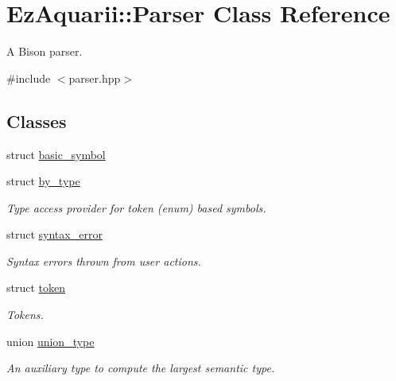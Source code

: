 \hypertarget{classEzAquarii_1_1Parser}{}\section{Ez\+Aquarii\+:\+:Parser Class Reference}
\label{classEzAquarii_1_1Parser}


A Bison parser.  




{\ttfamily \#include $<$parser.\+hpp$>$}

\subsection*{Classes}
\begin{DoxyCompactItemize}
\item 
struct \hyperlink{structEzAquarii_1_1Parser_1_1basic__symbol}{basic\+\_\+symbol}
\item 
struct \hyperlink{structEzAquarii_1_1Parser_1_1by__type}{by\+\_\+type}
\begin{DoxyCompactList}\small\item\em Type access provider for token (enum) based symbols. \end{DoxyCompactList}\item 
struct \hyperlink{structEzAquarii_1_1Parser_1_1syntax__error}{syntax\+\_\+error}
\begin{DoxyCompactList}\small\item\em Syntax errors thrown from user actions. \end{DoxyCompactList}\item 
struct \hyperlink{structEzAquarii_1_1Parser_1_1token}{token}
\begin{DoxyCompactList}\small\item\em Tokens. \end{DoxyCompactList}\item 
union \hyperlink{unionEzAquarii_1_1Parser_1_1union__type}{union\+\_\+type}
\begin{DoxyCompactList}\small\item\em An auxiliary type to compute the largest semantic type. \end{DoxyCompactList}\end{DoxyCompactItemize}

